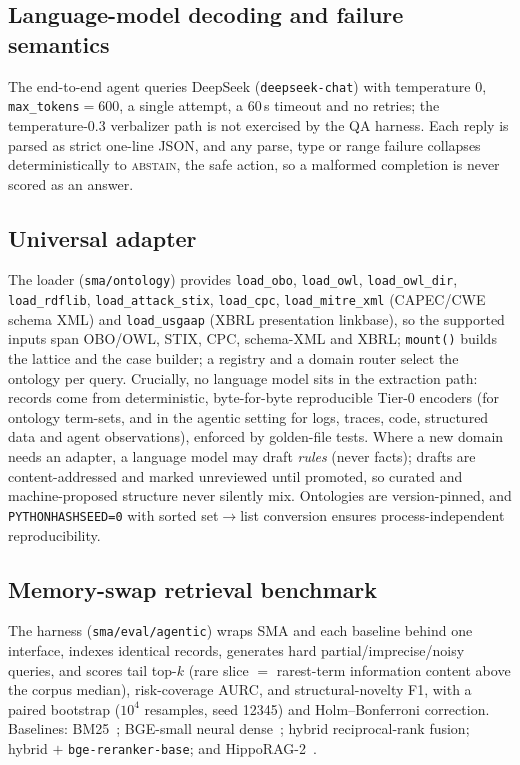 \documentclass[pdflatex,sn-nature]{sn-jnl}
\begin{document}
\subsection{Language-model decoding and failure semantics}
 The end-to-end agent
queries DeepSeek (\texttt{deepseek-chat}) with temperature $0$,
\texttt{max\_tokens}${=}600$, a single attempt, a $60$\,s timeout and no retries;
the temperature-$0.3$ verbalizer path is not exercised by the QA harness. Each
reply is parsed as strict one-line JSON, and any parse, type or range failure
collapses deterministically to \textsc{abstain}, the safe action, so a
malformed completion is never scored as an answer.

\subsection{Universal adapter}
 The loader (\texttt{sma/ontology}) provides
\texttt{load\_obo}, \texttt{load\_owl}, \texttt{load\_owl\_dir},
\texttt{load\_rdflib}, \texttt{load\_attack\_stix}, \texttt{load\_cpc},
\texttt{load\_mitre\_xml} (CAPEC/CWE schema XML) and \texttt{load\_usgaap} (XBRL
presentation linkbase), so the supported inputs span OBO/OWL, STIX, CPC,
schema-XML and XBRL; \texttt{mount()} builds the lattice and the case builder; a
registry and a domain router select the ontology per query. Crucially, no language
model sits in the extraction path: records come from deterministic, byte-for-byte
reproducible Tier-0 encoders (for ontology term-sets, and in the agentic setting
for logs, traces, code, structured data and agent observations), enforced by
golden-file tests. Where a new domain needs an adapter, a language model may draft
\emph{rules} (never facts); drafts are content-addressed and marked unreviewed
until promoted, so curated and machine-proposed structure never silently mix.
Ontologies are version-pinned, and \texttt{PYTHONHASHSEED=0} with sorted
set$\to$list conversion ensures process-independent reproducibility.

\subsection{Memory-swap retrieval benchmark}
 The harness (\texttt{sma/eval/agentic})
wraps SMA and each baseline behind one interface, indexes identical records,
generates hard partial/imprecise/noisy queries, and scores tail top-$k$ (rare
slice $=$ rarest-term information content above the corpus median), risk-coverage
AURC, and structural-novelty F1, with a paired bootstrap ($10^4$ resamples, seed
12345) and Holm--Bonferroni correction. Baselines: BM25~\cite{robertson2009bm25};
BGE-small neural dense~\cite{karpukhin2020dpr}; hybrid reciprocal-rank fusion;
hybrid $+$ \texttt{bge-reranker-base}; and HippoRAG-2~\cite{gutierrez2024hipporag}.
\end{document}
